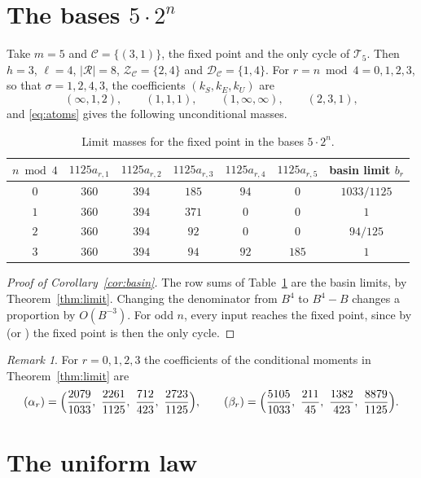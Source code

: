 \documentclass[11pt]{amsart}
\theoremstyle{remark}
\newtheorem*{remark}{Remark}
\newcommand{\T}{\mathcal{T}}
\newcommand{\C}{\mathcal{C}}
\newcommand{\R}{\mathcal{R}}
\newcommand{\Zs}{\mathcal{Z}}
\newcommand{\Ds}{\mathcal{D}}
\begin{document}
\section{The bases \texorpdfstring{$5\cdot2^n$}{5*2\^{}n}}\label{sec:five}

Take $m=5$ and $\C=\{(3,1)\}$, the fixed point and the only cycle of $\T_5$. Then $h=3$, $\ell=4$, $|\R|=8$, $\Zs_\C=\{2,4\}$ and $\Ds_\C=\{1,4\}$. For $r=n\bmod4=0,1,2,3$, so that $\sigma=1,2,4,3$, the coefficients $(k_S,k_E,k_U)$ are
\[
(\infty,1,2),\qquad(1,1,1),\qquad(1,\infty,\infty),\qquad(2,3,1),
\]
and \eqref{eq:atoms} gives the following unconditional masses.

\begin{table}[ht]
\centering
\begin{tabular}{@{}ccccccc@{}}
\toprule
$n\bmod4$ & $1125a_{r,1}$ & $1125a_{r,2}$ & $1125a_{r,3}$ & $1125a_{r,4}$ & $1125a_{r,5}$ & basin limit $b_r$\\
\midrule
$0$ & $360$ & $394$ & $185$ & $94$ & $0$ & $1033/1125$\\
$1$ & $360$ & $394$ & $371$ & $0$ & $0$ & $1$\\
$2$ & $360$ & $394$ & $92$ & $0$ & $0$ & $94/125$\\
$3$ & $360$ & $394$ & $94$ & $92$ & $185$ & $1$\\
\bottomrule
\end{tabular}
\caption{Limit masses for the fixed point in the bases $5\cdot2^n$.}\label{tab:five}
\end{table}

\begin{proof}[Proof of Corollary~\ref{cor:basin}]
The row sums of Table~\ref{tab:five} are the basin limits, by Theorem~\ref{thm:limit}. Changing the denominator from $B^4$ to $B^4-B$ changes a proportion by $O(B^{-3})$. For odd $n$, every input reaches the fixed point, since by \cite[Theorem~1]{G1} (or \cite[Theorem~4.1]{HP}) the fixed point is then the only cycle.
\end{proof}

\begin{remark}
For $r=0,1,2,3$ the coefficients of the conditional moments in Theorem~\ref{thm:limit} are
\[
(\alpha_r)=\Bigl(\frac{2079}{1033},\ \frac{2261}{1125},\ \frac{712}{423},\ \frac{2723}{1125}\Bigr),\qquad
(\beta_r)=\Bigl(\frac{5105}{1033},\ \frac{211}{45},\ \frac{1382}{423},\ \frac{8879}{1125}\Bigr).
\]
\end{remark}

\section{The uniform law}\label{sec:uniform}
\end{document}
